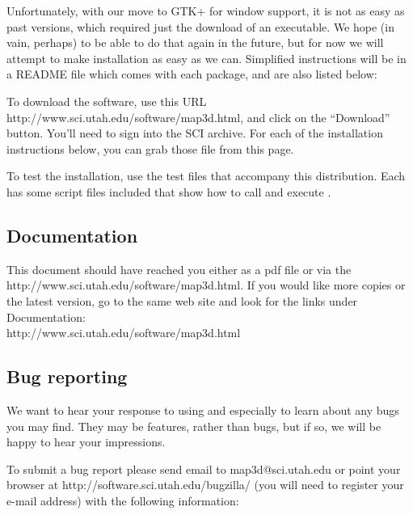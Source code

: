 Unfortunately, with our move to GTK+ for window support, it is not as easy
as past versions, which required just the download of an executable.  We
hope (in vain, perhaps) to be able to do that again in the future, but for
now we will attempt to make installation as easy as we can.  Simplified
instructions will be in a README file which comes with each package, and
are also listed below:

To download the software, use this URL
{http://www.sci.utah.edu/software/map3d.html}, and click on the
``Download'' button.  You'll need to sign into the SCI archive.  For
each of the installation instructions below, you can grab those file
from this page.


To test the installation, use the test files that accompany this
distribution.  Each has some script files included that show how to call
and execute \map{}.




%


\subsection{Documentation}

This document should have reached you either as a pdf file or via the
{http://www.sci.utah.edu/software/map3d.html}.  If you would like more
copies or the latest version, go to the
same web site and look for the links under Documentation:\\

{http://www.sci.utah.edu/software/map3d.html}

\subsection{Bug reporting}

We want to hear your response to using \map{} and especially to learn about
any bugs you may find.  They may be features, rather than bugs, but if so,
we will be happy to hear your impressions.

To submit a bug report please send email to map3d@sci.utah.edu or point your
browser at
{http://software.sci.utah.edu/bugzilla/} (you will need to register your e-mail
address) with the following information:

